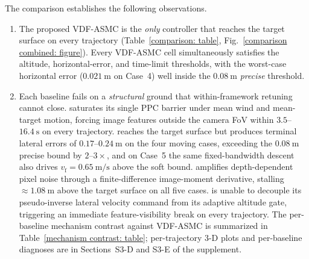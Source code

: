 The comparison establishes the following observations.
\begin{enumerate}
    \item The proposed VDF-ASMC is the \emph{only} controller that reaches the target surface on every trajectory (Table~\ref{comparison: table}, Fig.~\ref{comparison combined: figure}). Every VDF-ASMC cell simultaneously satisfies the altitude, horizontal-error, and time-limit thresholds, with the worst-case horizontal error ($0.021~\text{m}$ on Case~4) well inside the $0.08~\text{m}$ \emph{precise} threshold.
    \item Each baseline fails on a \emph{structural} ground that within-framework retuning cannot close. \cite{lin2022} saturates its single PPC barrier under mean wind and mean-target motion, forcing image features outside the camera FoV within $3.5$--$16.4~\text{s}$ on every trajectory. \cite{zhang2026} reaches the target surface but produces terminal lateral errors of $0.17$--$0.24~\text{m}$ on the four moving cases, exceeding the $0.08~\text{m}$ precise bound by $2$--$3\times$, and on Case~5 the same fixed-bandwidth descent also drives $v_\text{f}=0.65~\text{m/s}$ above the soft bound. \cite{chen2025} amplifies depth-dependent pixel noise through a finite-difference image-moment derivative, stalling $\approx 1.08~\text{m}$ above the target surface on all five cases. \cite{cho2022} is unable to decouple its pseudo-inverse lateral velocity command from its adaptive altitude gate, triggering an immediate feature-visibility break on every trajectory. The per-baseline mechanism contrast against VDF-ASMC is summarized in Table~\ref{mechanism contrast: table}; per-trajectory 3-D plots and per-baseline diagnoses are in Sections~S3-D and S3-E of the supplement.


\end{enumerate}
